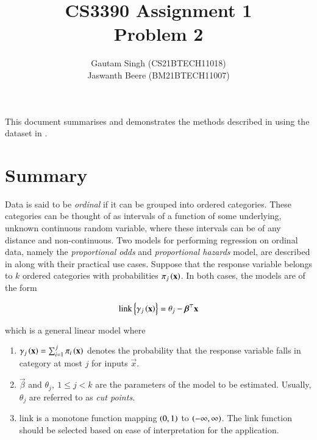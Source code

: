 \documentclass[journal,12pt,twocolumn]{IEEEtran}
\begin{document}
\vspace{3cm}
\title{CS3390 Assignment 1\\Problem 2}
\author{Gautam Singh (CS21BTECH11018)\\Jaswanth Beere (BM21BTECH11007)}
\maketitle
\tableofcontents
\bigskip

This document summarises and demonstrates the methods described in \cite{PMC80}
using the dataset in \cite{misc_wine_quality_186}.

\section{Summary}

Data is said to be \emph{ordinal} if it can be grouped into ordered categories.
These categories can be thought of as intervals of a function of some
underlying, unknown continuous random variable, where these intervals can be of
any distance and non-continuous. Two models for performing regression on ordinal
data, namely the \emph{proportional odds} and \emph{proportional hazards} model,
are described in \cite{PMC80} along with their practical use cases. Suppose that
the response variable belongs to \(k\) ordered categories with probabilities
\(\pi_j\left(\boldsymbol{\mathbf{x}}\right)\). In both cases, the models are of the form

\begin{equation}
     \mathrm{link}\left\{\gamma_j\left(\boldsymbol{\mathbf{x}}\right)\right\} = \theta_j - \boldsymbol{\mathbf{\beta}}^\top\boldsymbol{\mathbf{x}}
     \label{eq:ord-reg-model}
\end{equation}

which is a general linear model where 

\begin{enumerate}
     \item \(\gamma_j\left(\boldsymbol{\mathbf{x}}\right) = \sum_{i=1}^j \pi_i\left(\boldsymbol{\mathbf{x}}\right)\) denotes
     the probability that the response variable falls in category at most \(j\)
     for inputs \(\vec{x}\).
     \item \(\vec{\beta}\) and \(\theta_j,\ 1 \le j < k\) are the parameters of the model to
     be estimated. Usually, \(\theta_j\) are referred to as \emph{cut points}.
     \item \(\mathrm{link}\) is a monotone function mapping \(\left(0,1\right)\) to
     \(\left(-\infty,\infty\right)\). The link function should be selected based on
     ease of interpretation for the application.
\end{enumerate}
\end{document}
